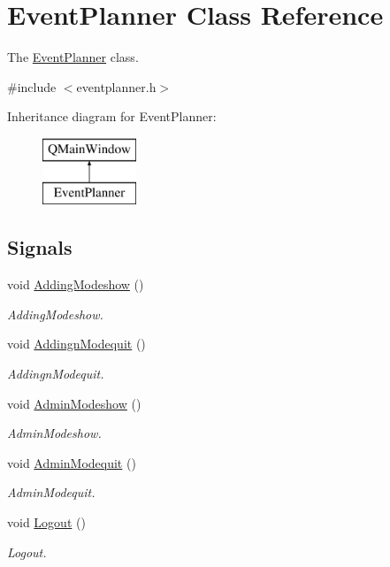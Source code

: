 \hypertarget{class_event_planner}{}\section{Event\+Planner Class Reference}
\label{class_event_planner}


The \hyperlink{class_event_planner}{Event\+Planner} class.  




{\ttfamily \#include $<$eventplanner.\+h$>$}

Inheritance diagram for Event\+Planner\+:\begin{figure}[H]
\begin{center}
\leavevmode
\includegraphics[height=2.000000cm]{class_event_planner}
\end{center}
\end{figure}
\subsection*{Signals}
\begin{DoxyCompactItemize}
\item 
void \hyperlink{class_event_planner_ac29d7162ba23478a3ca83d9a3451317e}{Adding\+Modeshow} ()
\begin{DoxyCompactList}\small\item\em Adding\+Modeshow. \end{DoxyCompactList}\item 
void \hyperlink{class_event_planner_a11d013b57831e685d134d824db883ad3}{Addingn\+Modequit} ()
\begin{DoxyCompactList}\small\item\em Addingn\+Modequit. \end{DoxyCompactList}\item 
void \hyperlink{class_event_planner_ae781e84143069d552b60b7856e7b0ad6}{Admin\+Modeshow} ()
\begin{DoxyCompactList}\small\item\em Admin\+Modeshow. \end{DoxyCompactList}\item 
void \hyperlink{class_event_planner_ab721a944eda1470ebb158bc815cc8734}{Admin\+Modequit} ()
\begin{DoxyCompactList}\small\item\em Admin\+Modequit. \end{DoxyCompactList}\item 
void \hyperlink{class_event_planner_a3c7b9e879f05ecb64f1d893084b1101c}{Logout} ()
\begin{DoxyCompactList}\small\item\em Logout. \end{DoxyCompactList}\end{DoxyCompactItemize}

